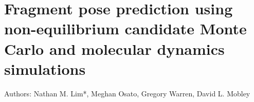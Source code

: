 \chapter{Fragment pose prediction using non-equilibrium candidate Monte Carlo and molecular dynamics simulations} \label{SEH-BLUES}

\small{Authors: Nathan M. Lim*, Meghan Osato, Gregory Warren, David L. Mobley}\\